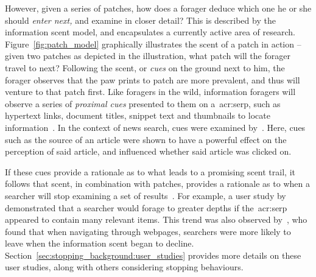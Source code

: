However, given a series of patches, how does a forager deduce which one he or she should \emph{enter next,} and examine in closer detail? This is described by the information scent model, and encapsulates a currently active area of research. Figure~\ref{fig:patch_model} graphically illustrates the scent of a patch in action -- given two patches as depicted in the illustration, what patch will the forager travel to next? Following the scent, or \emph{cues} on the ground next to him, the forager observes that the paw prints to patch  are more prevalent, and thus will venture to that patch first. Like foragers in the wild, information foragers will observe a series of \emph{proximal cues} presented to them on a~\gls{acr:serp}, such as hypertext links, document titles, snippet text and thumbnails to locate information~\citep{pirolli1995ift, pirolli1999ift, chi2001information_scent, oltston2003scenttrails, pirolli2007ift}. In the context of news search, cues were examined by~\cite{sundar2007news_scent}. Here, cues such as the source of an article were shown to have a powerful effect on the perception of said article, and influenced whether said article was clicked on.

If these cues provide a rationale as to what leads to a promising scent trail, it follows that scent, in combination with patches, provides a rationale as to when a searcher will stop examining a set of results~\citep{pirolli1999ift, wu2012dc, wu2014information_scent}. For example, a user study by~\cite{wu2014information_scent} demonstrated that a searcher would forage to greater depths if the~\gls{acr:serp} appeared to contain many relevant items. This trend was also observed by~\cite{card2001scent_graphs}, who found that when navigating through webpages, searchers were more likely to leave when the information scent began to decline. Section~\ref{sec:stopping_background:user_studies} provides more details on these user studies, along with others considering stopping behaviours.

